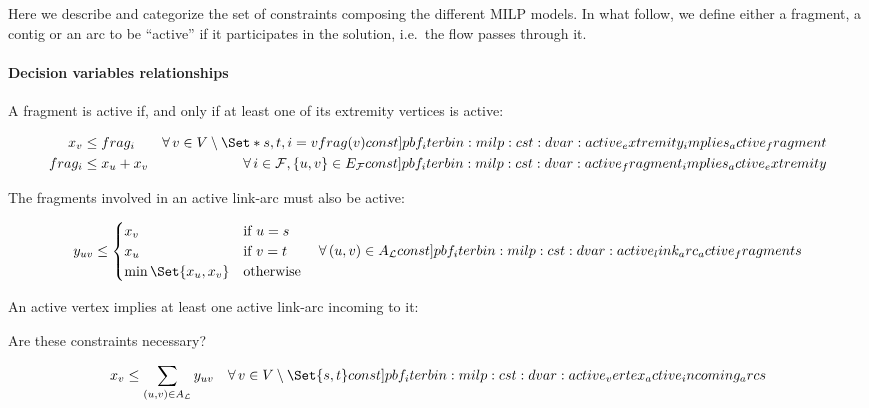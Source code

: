 Here we describe and categorize the set of constraints composing the different MILP models.
In what follow, we define either a fragment, a contig or an arc to be \enquote{active} if it participates in the solution, i.e.\ the flow passes through it.

\paragraph{Decision variables relationships}

A fragment is active if, and only if at least one of its extremity vertices is active:
\begin{Constraint}
  \begin{align}
    x_v & \leq \frag{i} & \forall v \in V \setminus \Set*{s, t}, i = vfrag(v) \cstlabel{pbf_iterbin:milp:cst:dvar:active_extremity_implies_active_fragment} \\ %
    \frag{i} & \leq x_u + x_v & \forall i \in \Fragments{}, \{u, v\} \in \EFrags{} \cstlabel{pbf_iterbin:milp:cst:dvar:active_fragment_implies_active_extremity} %
  \end{align}
\end{Constraint}

The fragments involved in an active link-arc must also be active:
\begin{Constraint}
  \begin{equation}
    y_{uv} \leq
    \begin{cases}
      x_v & \text{if \(u = s\)} \\
      x_u & \text{if \(v = t\)} \\
      \min\Set{x_u, x_v} & \text{otherwise}
    \end{cases} \quad \forall (u, v) \in A_\Links{} %
    \cstlabel{pbf_iterbin:milp:cst:dvar:active_link_arc_active_fragments} %
  \end{equation}
\end{Constraint}

An active vertex implies at least one active link-arc incoming to it:
\begin{questionbox}
  Are these constraints necessary?
\end{questionbox}
\begin{Constraint}
  \begin{equation}
    x_v \leq \sum_{(u, v) \in A_\Links{}} y_{u v} \quad \forall v \in V \setminus \Set{s, t} \cstlabel{pbf_iterbin:milp:cst:dvar:active_vertex_active_incoming_arcs} %
  \end{equation}
\end{Constraint}

